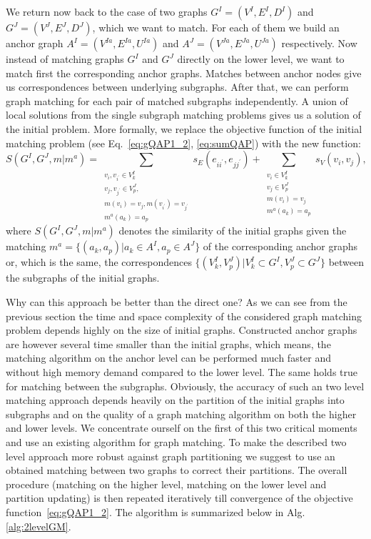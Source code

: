 We return now back to the case of two graphs $G^I=(V^I,E^I,D^I)$ and $G^J=(V^J,E^J,D^J)$, which we want to match. 
For each of them we build an anchor graph $A^I=(V^{Ia},E^{Ia},U^{Ia})$ and $A^J=(V^{Ja},E^{Ja},U^{Ja})$ respectively.
Now instead of matching graphs $G^I$ and $G^J$ directly on the lower level, we want to match first the corresponding anchor graphs. Matches between anchor nodes give us correspondences between underlying subgraphs. After that, we can perform graph matching for each pair of matched subgraphs independently. A union of local solutions from the single subgraph matching problems gives us a solution of the initial problem. More formally, we replace the objective function of the initial matching problem (see Eq.~\eqref{eq:gQAP1_2}, \eqref{eq:sumQAP}) with the new function:
\begin{equation}\label{eq:sumQAP_2}
	S(G^I,G^J,m|m^a)=\sum_{\substack{ v_{i},v_{i^\prime}\in V^I_k\\v_{j},v_{j^\prime}\in V^J_p,\\m(v_i)=v_j, m(v_{i^\prime})=v_{j^\prime}\\ m^a(a_k)=a_p}}s_E(e_{ii^\prime},e_{jj^\prime}) + \sum_{\substack{ v_{i}\in V^I_k\\v_{j}\in V^J_p\\m(v_i)=v_j\\ m^a(a_k)=a_p}}s_V(v_{i},v_{j}),
\end{equation}
where $S(G^I,G^J,m|m^a)$ denotes the similarity of the initial graphs given the matching $m^a=\{(a_k,a_p)|a_k\in A^I,a_p\in A^J\}$ of the corresponding anchor graphs or, which is the same, the correspondences $\{(V^ I_k,V^J_p)|V^I_k\subset G^I,V^J_p\subset G^J\}$ between the subgraphs of the initial graphs.

Why can this approach be better than the direct one? As we can see from the previous section the time and space complexity of the considered graph matching problem depends highly on the size of initial graphs. Constructed anchor graphs are however several time smaller than the initial graphs, which means, the matching algorithm on the anchor level can be performed much faster and without high memory demand compared to the lower level. The same holds true for matching between the subgraphs.
Obviously, the accuracy of such an two level matching approach depends heavily on the partition of the initial graphs into subgraphs and on the quality of a graph matching algorithm on both the higher and lower levels. We concentrate ourself on the first of this two critical moments and use an existing algorithm for graph matching. To make the described two level approach more robust against graph partitioning we suggest to use an obtained matching between two graphs to correct their partitions. The overall procedure (matching on the higher level, matching on the lower level and partition updating) is then repeated iteratively till convergence of the objective function~\eqref{eq:gQAP1_2}. The algorithm is summarized below in Alg.\ref{alg:2levelGM}.


